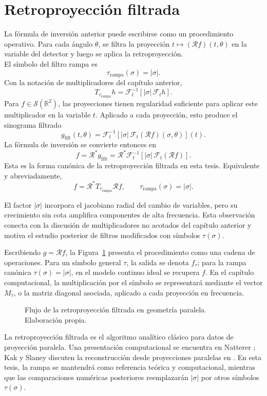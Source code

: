 \section{Retroproyección filtrada}

La fórmula de inversión anterior puede escribirse como un procedimiento operativo. Para cada ángulo $\theta$, se filtra la proyección $t\mapsto(\mathcal Rf)(t,\theta)$ en la variable del detector y luego se aplica la retroproyección.\\

El símbolo del filtro rampa es
\[
\tau_{\mathrm{rampa}}(\sigma)=|\sigma|.
\]
Con la notación de multiplicadores del capítulo anterior,
\[
T_{\tau_{\mathrm{rampa}}}h
=
\mathcal F_t^{-1}
\left[
|\sigma|\,\mathcal F_t h
\right].
\]
Para $f\in\mathcal S(\mathbb R^2)$, las proyecciones tienen regularidad suficiente para aplicar este multiplicador en la variable $t$.
Aplicado a cada proyección, esto produce el sinograma filtrado
\[
g_{\mathrm{filt}}(t,\theta)
=
\mathcal F_t^{-1}
\left[
|\sigma|\,\mathcal F_t(\mathcal Rf)(\sigma,\theta)
\right](t).
\]
La fórmula de inversión se convierte entonces en
\[
f
=
\mathcal R^*g_{\mathrm{filt}}
=
\mathcal R^*
\mathcal F_t^{-1}
\left[
|\sigma|\,\mathcal F_t(\mathcal Rf)
\right].
\]
Esta es la forma canónica de la retroproyección filtrada en esta tesis.
Equivalente y abreviadamente,
\[
f=\mathcal R^*T_{\tau_{\mathrm{rampa}}}\mathcal Rf,
\qquad
\tau_{\mathrm{rampa}}(\sigma)=|\sigma|.
\]

El factor $|\sigma|$ incorpora el jacobiano radial del cambio de variables, pero su crecimiento sin cota amplifica componentes de alta frecuencia. Esta observación conecta con la discusión de multiplicadores no acotados del capítulo anterior y motiva el estudio posterior de filtros modificados con símbolos $\tau(\sigma)$.

Escribiendo $g=\mathcal Rf$, la Figura~\ref{fig:fbp-flujo} presenta el procedimiento como una cadena de operaciones. Para un símbolo general $\tau$, la salida se denota $f_\tau$; para la rampa canónica $\tau(\sigma)=|\sigma|$, en el modelo continuo ideal se recupera $f$. En el capítulo computacional, la multiplicación por el símbolo se representará mediante el vector $M_\tau$, o la matriz diagonal asociada, aplicado a cada proyección en frecuencia.

\begin{figure}[htbp]
\centering
\resizebox{0.92\textwidth}{!}{}
\caption{Flujo de la retroproyección filtrada en geometría paralela. Elaboración propia.}
\label{fig:fbp-flujo}
\end{figure}

La retroproyección filtrada es el algoritmo analítico clásico para datos de proyección paralela. Una presentación computacional se encuentra en Natterer \cite[Sec.~V.1, p.~102 y ss.]{natterer2001}; Kak y Slaney discuten la reconstrucción desde proyecciones paralelas en \cite[Sec.~3.3]{kak_slaney1988}. En esta tesis, la rampa se mantendrá como referencia teórica y computacional, mientras que las comparaciones numéricas posteriores reemplazarán $|\sigma|$ por otros símbolos $\tau(\sigma)$.
